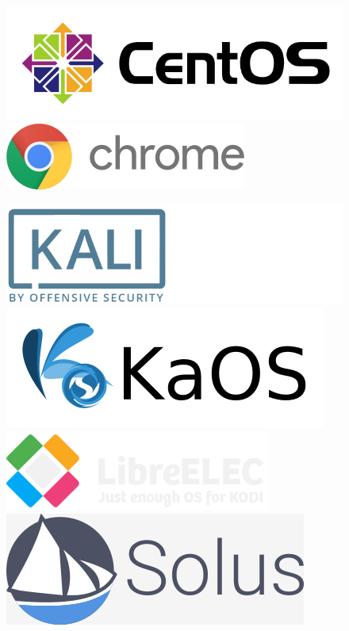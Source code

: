 \begin{figure}[ht!]
	\includegraphics[width=0.2\paperwidth]{./img/linux/centos}
	\includegraphics[width=0.2\paperwidth]{./img/linux/chrome}
	
	
	\includegraphics[width=0.2\paperwidth]{./img/linux/kali}
	\includegraphics[width=0.2\paperwidth]{./img/linux/kaos}
	\includegraphics[width=0.2\paperwidth]{./img/linux/libreelec}
	\includegraphics[width=0.2\paperwidth]{./img/linux/solus}

\end{figure}
